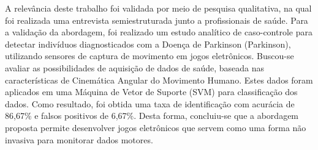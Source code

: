 A relevância deste trabalho foi validada por meio de pesquisa qualitativa, na qual foi realizada uma entrevista semiestruturada junto a profissionais de saúde. Para a validação da abordagem, foi realizado um estudo analítico de caso-controle para detectar indivíduos diagnosticados com a Doença de Parkinson (Parkinson), utilizando sensores de captura de movimento em jogos eletrônicos. Buscou-se avaliar as possibilidades de aquisição de dados de saúde, baseada nas características de Cinemática Angular do Movimento Humano. Estes dados foram aplicados em uma Máquina de Vetor de Suporte (SVM) para classificação dos dados. Como resultado, foi obtida uma taxa de identificação com acurácia de 86,67\% e falsos positivos de 6,67\%. Desta forma, concluiu-se que a abordagem proposta permite desenvolver jogos eletrônicos que servem como uma forma não invasiva para monitorar dados motores.




